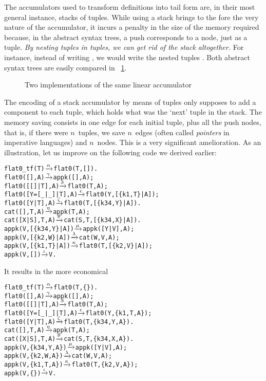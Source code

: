 The accumulators used to transform definitions into tail form are, in
their most general instance, stacks of tuples. While using a stack
brings to the fore the very nature of the accumulator, it incurs a
penalty in the size of the memory required because, in the abstract
syntax trees, a push corresponds to a node, just as a tuple. \emph{By
  nesting tuples in tuples, we can get rid of the stack altogether.}
For instance, instead of writing
\erlcode{[\{k3,\(X_1\)\},\{k1,\(V\),\(E\)\},\{k3,\(X_2\)\}]}, we would
write the nested tuples
. Both
abstract syntax trees are easily compared in
\fig~\ref{fig:tuple_vs_stack}.
\begin{figure}
\centering
{}
\caption{Two implementations of the same linear accumulator
\label{fig:tuple_vs_stack}}
\end{figure}
The encoding of a stack accumulator by means of tuples only supposes
to add a component to each tuple, which holds what was the `next'
tuple in the stack. The memory saving consists in one edge for each
initial tuple, plus all the push nodes, that is, if there were
\(n\)~tuples, we save \(n\)~edges (often called \emph{pointers} in
imperative languages) and \(n\)~nodes. This is a very significant
amelioration. As an illustration, let us improve on the following code
we derived earlier: 
\begin{alltt}
flat0\_tf(T)          \(\smashedrightarrow{\alpha}\) flat0(T,[]).
flat0(         [],A) \(\smashedrightarrow{\gamma}\) appk([],A);
flat0(     [[]|T],A) \(\smashedrightarrow{\delta}\) flat0(T,A);
flat0([Y=[\_|\_]|T],A) \(\smashedrightarrow{\epsilon}\) flat0(Y,[\{k1,T\}|A]);
flat0(    [Y|T],A)   \(\smashedrightarrow{\zeta}\) flat0(T,[\{k34,Y\}|A]).
cat(   [],T,A)       \(\smashedrightarrow{\eta}\) appk(T,A);
cat([X|S],T,A)       \(\smashedrightarrow{\theta}\) cat(S,T,[\{k34,X\}|A]).
appk(V,[\{k34,Y\}|A])  \(\smashedrightarrow{\mu}\) appk([Y|V],A);
appk(V, [\{k2,W\}|A])  \(\smashedrightarrow{\lambda}\) cat(W,V,A);
appk(V, [\{k1,T\}|A])  \(\smashedrightarrow{\kappa}\) flat0(T,[\{k2,V\}|A]);
appk(V,         [])  \(\smashedrightarrow{\iota}\) V.
\end{alltt}
It results in the more economical
\begin{alltt}
flat0\_tf(T)          \(\smashedrightarrow{\alpha}\) flat0(T,\{\}).
flat0(         [],A) \(\smashedrightarrow{\gamma}\) appk([],A);
flat0(     [[]|T],A) \(\smashedrightarrow{\delta}\) flat0(T,A);
flat0([Y=[\_|\_]|T],A) \(\smashedrightarrow{\epsilon}\) flat0(Y,\{k1,T,A\});
flat0(      [Y|T],A) \(\smashedrightarrow{\zeta}\) flat0(T,\{k34,Y,A\}).
cat(   [],T,A)       \(\smashedrightarrow{\eta}\) appk(T,A);
cat([X|S],T,A)       \(\smashedrightarrow{\theta}\) cat(S,T,\{k34,X,A\}).
appk(V,\{k34,Y,A\})    \(\smashedrightarrow{\mu}\) appk([Y|V],A);
appk(V, \{k2,W,A\})    \(\smashedrightarrow{\lambda}\) cat(W,V,A);
appk(V, \{k1,T,A\})    \(\smashedrightarrow{\kappa}\) flat0(T,\{k2,V,A\});
appk(V,       \{\})    \(\smashedrightarrow{\iota}\) V.
\end{alltt}
